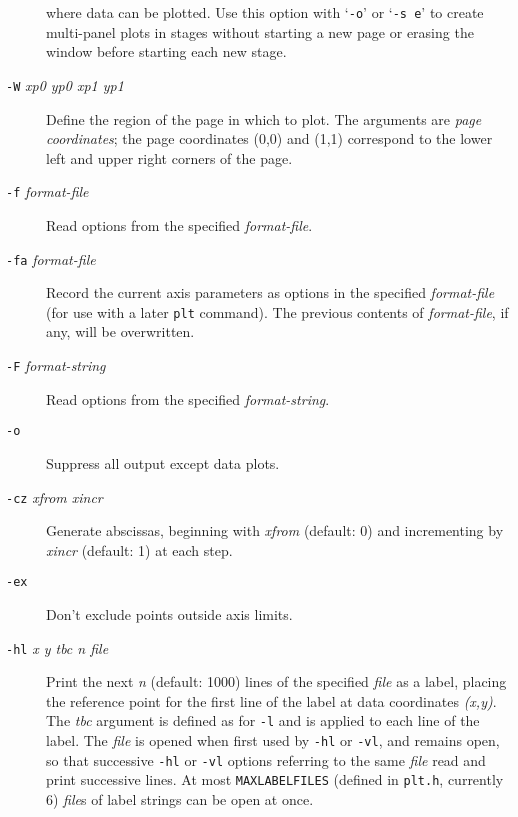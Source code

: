 \begin{description}
where data can be plotted.  Use this option with `\texttt{-o}' or `\texttt{-s e}' to create multi-panel
plots in stages without starting a new page or erasing the window before
starting each new stage. 
\item [\texttt{-W}\textit{ xp0 yp0 xp1 yp1} ] Define the region of the page
in which to plot.  The arguments are \textit{page coordinates};  the page coordinates
(0,0) and (1,1) correspond to the lower left and upper right corners of
the page. 
\item [\texttt{-f}\textit{ format-file} ] Read options from the specified \textit{format-file}. 
\item [\texttt{-fa}\textit{ format-file}
] Record the current axis parameters as options in the specified \textit{format-file}
(for use with a later \texttt{plt} command).  The previous contents of \textit{format-file},
if any, will be overwritten. 
\item [\texttt{-F}\textit{ format-string} ] Read options from the specified
\textit{format-string}. 
\item [\texttt{-o} ] Suppress all output except data plots. 
\item [\texttt{-cz}\textit{ xfrom xincr} ] Generate
abscissas, beginning with \textit{xfrom} (default: 0) and incrementing by \textit{xincr}
(default: 1) at each step. 
\item [\texttt{-ex} ] Don't exclude points outside axis limits. 
\item [\texttt{-hl}\textit{
x y tbc n file} ] Print the next \textit{n} (default: 1000) lines of the specified
\textit{file} as a label, placing the reference point for the first line of the
label at data coordinates \textit{(x,y)}.  The \textit{tbc} argument is defined as for \texttt{-l} and
is applied to each line of the label.  The \textit{file} is opened when first used
by \texttt{-hl} or \texttt{-vl}, and remains open, so that successive \texttt{-hl} or \texttt{-vl} options referring
to the same \textit{file} read and print successive lines.  At most \texttt{MAXLABELFILES}
(defined in \texttt{plt.h}, currently 6) \textit{file}s of label strings can be open at once.


\end{description}
